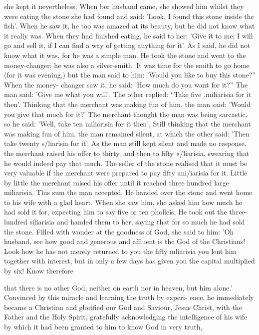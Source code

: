 she kept it nevertheless, When ber husband came, she showed him
whilst they were eating the stone she had found and said: 'Look, I
found this stone inside the fish'.
When he saw it, he too was amazed
at its beauty, but he did not know what it really was.
When they
had finished eating, he said to her: 'Give it to me; I will go and sell
it, if I can find a way of getting anything for it'.
As I said, he did
not know what it was, for he was a simple man.
He took the stone
and went to the money-changer; he was also a silver-smith.
It was
time for the smith to go home (for it was evening,) but the man said
to him: 'Would you like to buy this stone?” When the money-
changer saw it, he said: 'How much do you want for it?” The man
said: 'Give me what you will', The other replied: “Take five
.miliarisia for it then'.
Thinking that the merchant was making fun
of him, the man said: 'Would you give that much for it?' The
merchant thought the man was being sarcastic, so he said: 'Well,
take ten miliarisia for it then', Still thinking that the merchant was
making fun of him, the man remained silent, at which the other
said: 'Then take twenty s/liarisia for it'.
As the man still kept silent
and made no response, the merchant raised his offer to thirty, and
then to fifty «/liarisia, swearing that he would indeed pay that
much.
The seller of the stone realised that it must be very valuable
if the merchant were prepared to pay fifty ani/iarisia for it.
Little by
little the merchant raised his offer until it reached three hundred
large miliarisia.
This sum the man accepted.
He handed over the
stone and went home to his wife with a glad heart.
When she saw
him, she asked him how much he had sold it for, expecting him to
say five or ten pholleis, He took out the three-lundred siliarisia
and handed them to her, saying that for so much he had sold the
stone.
Filled with wonder at the goodness of God, she said to him:
'Oh husband, see how good and generous and affluent is the God
of the Christians! Look how he has not merely returned to you the
fifty mliarisia you lent him together with interest, but in only a few
days has given you the capital multiplied by six! Know therefore

that there is no other God, neither on earth nor in heaven, but him
alone.' Convinced by this miracle and learning the truth by experi-
ence, he immediately became a Christian and glorified our God and
Saviour, Jesus Christ, with the Father and the Holy Spirit, gratefully
acknowledging the intelligence of his wife by which it had been
granted to him to know God in very truth,

